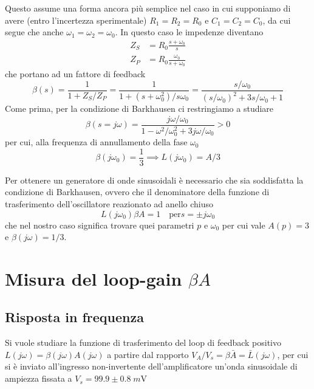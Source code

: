 \documentclass[10pt, a4paper, italian]{article}
\begin{document}
Questo assume una forma ancora più semplice nel caso in cui supponiamo di avere
(entro l'incertezza sperimentale) $R_1 = R_2 = R_0$ e $C_1 = C_2 = C_0$,
da cui segue che anche $\omega_1 = \omega_2 = \omega_0$. In questo caso le
impedenze diventano
\begin{align*}
Z_S &= R_0 \frac{s + \omega_0}{s} \\
Z_P &= R_0 \frac{\omega_0}{s + \omega_0}
\end{align*}
che portano ad un fattore di feedback
\begin{equation}
\beta(s) = \frac{1}{1 + Z_S/Z_P} =
\frac{1}{1 + (s + \omega_0^2)/s \omega_0} =
\frac{s/\omega_0}{(s/\omega_0)^2 + 3s/\omega_0 + 1}
\end{equation}
Come prima, per la condizione di Barkhausen ci restringiamo a studiare
\[
\beta(s = j \omega) = 
\frac{j \omega/\omega_0}{1 - \omega^2/\omega_0^2 + 3j \omega/\omega_0} > 0
\]
per cui, alla frequenza di annullamento della fase $\omega_0$
\begin{equation}\label{eq: loop-gain-approx}
\beta(j \omega_0) = \frac{1}{3} \implies L(j \omega_0) = A/3
\end{equation}

Per ottenere un generatore di onde sinusoidali è necessario che sia
soddisfatta la condizione di Barkhausen, ovvero che il denominatore della
funzione di trasferimento dell'oscillatore reazionato ad anello chiuso
\[
L(j \omega_0)\beta A = 1 \quad \text{per} s = \pm j \omega_0
\]
che nel nostro caso significa trovare quei parametri $p$ e $\omega_0$ per cui
vale $A(p) = 3$ e $\beta(j\omega) = 1/3$.



\section{Misura del loop-gain $\beta A$}

\subsection{Risposta in frequenza}
Si vuole studiare la funzione di trasferimento del loop di feedback positivo
$L(j\omega) = \beta(j\omega) A(j\omega)$ a partire dal rapporto
$V_A/V_s = \beta \bar{A} = \bar{L}(j\omega)$, per cui si è
inviato all'ingresso non-invertente dell'amplificatore un'onda sinusoidale
di ampiezza fissata a $V_s = 99.9 \pm 0.8 \; \si{m\V}$
\end{document}
